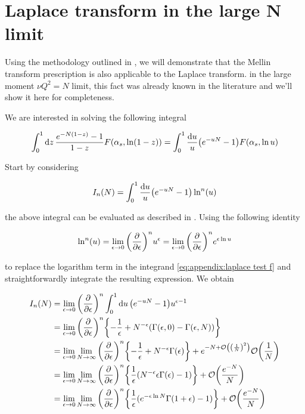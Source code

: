 \documentclass[../main.tex]{subfiles}
\begin{document}
\section{Laplace transform in the large N limit} \label{Appendix: Laplace and Mellin transform}

Using the methodology outlined in \cite{Catani_2003_appendix}, we will demonstrate that the Mellin transform prescription is also applicable to the Laplace transform.
in the large moment $\nu Q^2 = N$ limit, this fact was already known in the literature \cite{CATAN_large_chi} and we'll show it here for completeness.

We are interested in solving the following integral

\begin{equation}
    \int_0^1 \dd{z} \frac{e^{- N (1-z)} - 1}{1-z} F\qty(\alpha_s,\ln(1-z))= \int_0^1 \frac{\dd{u}}{u} \qty(e^{-u N} - 1) F\qty(\alpha_s , \ln u)
\end{equation}

Start by considering 

\begin{equation}\label{eq:appendix:laplace test f}
    I_n(N) = \int_0^1 \frac{\dd{u}}{u} \qty(e^{-u N} - 1) \ln^n(u) 
\end{equation}

the above integral can be evaluated as described in \cite{CATANI1989323}. Using the following identity

\begin{equation}
    \ln^n(u)= \lim_{\epsilon \to 0} \qty(\pdv{\epsilon})^n u^\epsilon = \lim_{\epsilon \to 0} \qty(\pdv{\epsilon})^n e^{\epsilon \ln u}
\end{equation}

to replace the logarithm term in the integrand \cref{eq:appendix:laplace test f} and straightforwardly integrate the resulting expression. We obtain

\begin{align}
    \begin{split}\label{eq:appendix:calculation}
    I_n(N) &= \lim_{\epsilon \to 0} \qty(\pdv{\epsilon})^n \int_0^1 \dd{u} \qty(e^{-u N} - 1) u^{\epsilon-1} \\
    &= \lim_{\epsilon \to 0} \qty(\pdv{\epsilon})^n \qty{-\frac{1}{\epsilon}+N^{-\epsilon} (\Gamma(\epsilon,0) - \Gamma(\epsilon,N))} \\
    &= \lim_{\epsilon \to 0} \lim_{N \to \infty} \qty(\pdv{\epsilon})^n \qty{-\frac{1}{\epsilon}+N^{-\epsilon} \Gamma(\epsilon)}+ e^{-N + \order{\qty(\frac{1}{N})^2}}\order{\frac{1}{N}} \\
    &= \lim_{\epsilon \to 0} \lim_{N \to \infty} \qty(\pdv{\epsilon})^n \qty{\frac{1}{\epsilon} (N^{-\epsilon} \epsilon \Gamma(\epsilon) -1)} + \order{\frac{e^{-N}}{N}}\\
    &= \lim_{\epsilon \to 0} \lim_{N \to \infty} \qty(\pdv{\epsilon})^n \qty{\frac{1}{\epsilon} ( e^{-\epsilon \ln N} \Gamma(1+\epsilon) -1)} + \order{\frac{e^{-N}}{N}}
    \end{split}
\end{align}
\end{document}
